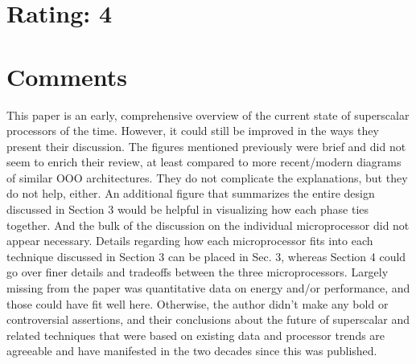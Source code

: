 \documentclass [12pt]{article}
\begin{document}
    \section{Rating: 4} %
    \label{sec:rating}
    \pagebreak

    \section{Comments} %
    \label{sec:comments}

    This paper is an early, comprehensive overview of the current state of superscalar processors of the time.  However, it could still be improved in the ways they present their discussion. The figures mentioned previously were brief and did not seem to enrich their review, at least compared to more recent/modern diagrams of similar OOO architectures. They do not complicate the explanations, but they do not help, either. An additional figure that summarizes the entire design discussed in Section 3 would be helpful in visualizing how each phase ties together. And the bulk of the discussion on the individual microprocessor did not appear necessary. Details regarding how each microprocessor fits into each technique discussed in Section 3 can be placed in Sec. 3, whereas Section 4 could go over finer details and tradeoffs between the three microprocessors. Largely missing from the paper was quantitative data on energy and/or performance, and those could have fit well here. Otherwise, the author didn't make any bold or controversial assertions, and their conclusions about the future of superscalar and related techniques that were based on existing data and processor trends are agreeable and have manifested in the two decades since this was published.


 
        


\end{document}
